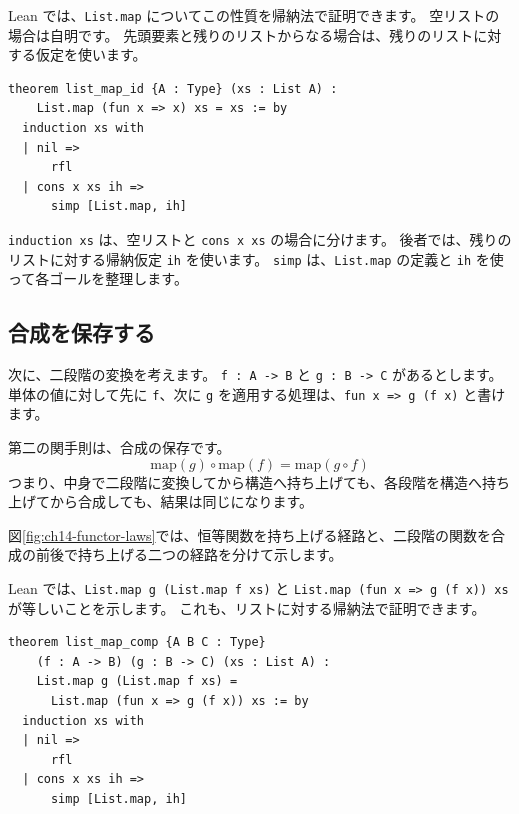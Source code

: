 Lean では、\texttt{List.map} についてこの性質を帰納法で証明できます。
空リストの場合は自明です。
先頭要素と残りのリストからなる場合は、残りのリストに対する仮定を使います。

\begin{listing}[htbp]
\begin{verbatim}
theorem list_map_id {A : Type} (xs : List A) :
    List.map (fun x => x) xs = xs := by
  induction xs with
  | nil =>
      rfl
  | cons x xs ih =>
      simp [List.map, ih]
\end{verbatim}
\caption{\texttt{list\_map\_id}}
\label{lst:ch14_list_map_id}
\end{listing}

\texttt{induction xs} は、空リストと \texttt{cons x xs} の場合に分けます。
後者では、残りのリストに対する帰納仮定 \texttt{ih} を使います。
\texttt{simp} は、\texttt{List.map} の定義と \texttt{ih} を使って各ゴールを整理します。


\subsection{合成を保存する}

次に、二段階の変換を考えます。
\texttt{f : A -> B} と \texttt{g : B -> C} があるとします。
単体の値に対して先に \texttt{f}、次に \texttt{g} を適用する処理は、\texttt{fun x => g (f x)} と書けます。

第二の関手則は、合成の保存です。
\[
  \mathrm{map}(g) \circ \mathrm{map}(f) = \mathrm{map}(g \circ f)
\]
つまり、中身で二段階に変換してから構造へ持ち上げても、各段階を構造へ持ち上げてから合成しても、結果は同じになります。

図\ref{fig:ch14-functor-laws}では、恒等関数を持ち上げる経路と、二段階の関数を合成の前後で持ち上げる二つの経路を分けて示します。


Lean では、\texttt{List.map g (List.map f xs)} と \texttt{List.map (fun x => g (f x)) xs} が等しいことを示します。
これも、リストに対する帰納法で証明できます。

\begin{listing}[htbp]
\begin{verbatim}
theorem list_map_comp {A B C : Type}
    (f : A -> B) (g : B -> C) (xs : List A) :
    List.map g (List.map f xs) =
      List.map (fun x => g (f x)) xs := by
  induction xs with
  | nil =>
      rfl
  | cons x xs ih =>
      simp [List.map, ih]
\end{verbatim}
\caption{\texttt{list\_map\_comp}}
\label{lst:ch14_list_map_comp}
\end{listing}

